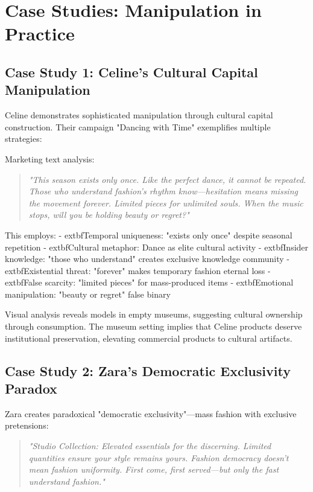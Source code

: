 \section{Case Studies: Manipulation in Practice}
\label{sec:fashion_cases}

\subsection{Case Study 1: Celine's Cultural Capital Manipulation}

Celine demonstrates sophisticated manipulation through cultural capital construction. Their campaign "Dancing with Time" exemplifies multiple strategies:

Marketing text analysis:
\begin{quote}
\textit{"This season exists only once. Like the perfect dance, it cannot be repeated. Those who understand fashion's rhythm know—hesitation means missing the movement forever. Limited pieces for unlimited souls. When the music stops, will you be holding beauty or regret?"}
\end{quote}

This employs:
- 	extbf{Temporal uniqueness}: "exists only once" despite seasonal repetition
- 	extbf{Cultural metaphor}: Dance as elite cultural activity
- 	extbf{Insider knowledge}: "those who understand" creates exclusive knowledge community
- 	extbf{Existential threat}: "forever" makes temporary fashion eternal loss
- 	extbf{False scarcity}: "limited pieces" for mass-produced items
- 	extbf{Emotional manipulation}: "beauty or regret" false binary

Visual analysis reveals models in empty museums, suggesting cultural ownership through consumption. The museum setting implies that Celine products deserve institutional preservation, elevating commercial products to cultural artifacts.

\subsection{Case Study 2: Zara's Democratic Exclusivity Paradox}

Zara creates paradoxical "democratic exclusivity"—mass fashion with exclusive pretensions:

\begin{quote}
\textit{"Studio Collection: Elevated essentials for the discerning. Limited quantities ensure your style remains yours. Fashion democracy doesn't mean fashion uniformity. First come, first served—but only the fast understand fashion."}
\end{quote}

